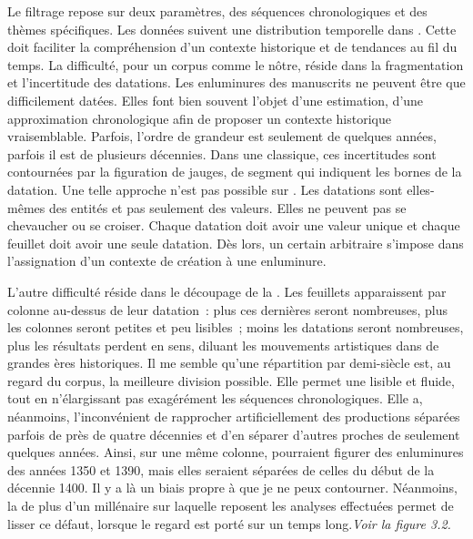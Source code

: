 Le filtrage repose sur deux paramètres, des séquences chronologiques et des thèmes spécifiques. Les données suivent une distribution temporelle dans . Cette  doit faciliter la compréhension d’un contexte historique et de tendances au fil du temps. La difficulté, pour un corpus comme le nôtre, réside dans la fragmentation et l’incertitude des datations. Les enluminures des manuscrits ne peuvent être que difficilement datées. Elles font bien souvent l’objet d’une estimation, d’une approximation chronologique afin de proposer un contexte historique vraisemblable. Parfois, l’ordre de grandeur est seulement de quelques années, parfois il est de plusieurs décennies. Dans une  classique, ces incertitudes sont contournées par la figuration de jauges, de segment qui indiquent les bornes de la datation. Une telle approche n’est pas possible sur . Les datations sont elles-mêmes des entités et pas seulement des valeurs. Elles ne peuvent pas se chevaucher ou se croiser. Chaque datation doit avoir une valeur unique et chaque feuillet doit avoir une seule datation. Dès lors, un certain arbitraire s’impose dans l’assignation d’un contexte de création à une enluminure.\par
L’autre difficulté réside dans le découpage de la . Les feuillets apparaissent par colonne au-dessus de leur datation~: plus ces dernières seront nombreuses, plus les colonnes seront petites et peu lisibles~; moins les datations seront nombreuses, plus les résultats perdent en sens, diluant les mouvements artistiques dans de grandes ères historiques. Il me semble qu’une répartition par demi-siècle est, au regard du corpus, la meilleure division possible. Elle permet une  lisible et fluide, tout en n’élargissant pas exagérément les séquences chronologiques. Elle a, néanmoins, l’inconvénient de rapprocher artificiellement des productions séparées parfois de près de quatre décennies et d’en séparer d’autres proches de seulement quelques années. Ainsi, sur une même colonne, pourraient figurer des enluminures des années 1350 et 1390, mais elles seraient séparées de celles du début de la décennie 1400. Il y a là un biais propre à  que je ne peux contourner. Néanmoins, la  de plus d’un millénaire sur laquelle reposent les analyses effectuées permet de lisser ce défaut, lorsque le regard est porté sur un temps long.\textit{Voir la figure 3.2.}\par
